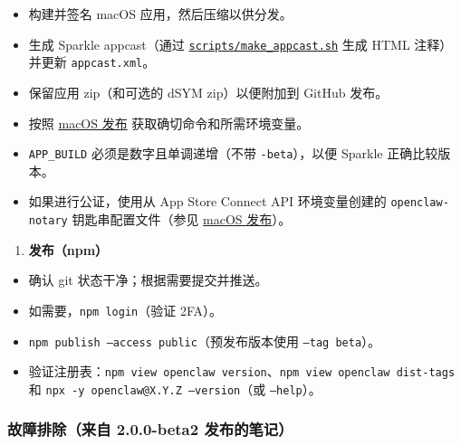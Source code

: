 \begin{itemize}
  \item [ ] 构建并签名 macOS 应用，然后压缩以供分发。
  \item [ ] 生成 Sparkle appcast（通过 \href{https://github.com/openclaw/openclaw/blob/main/scripts/make\_appcast.sh}{\texttt{scripts/make\_appcast.sh}} 生成 HTML 注释）并更新 \texttt{appcast.xml}。
  \item [ ] 保留应用 zip（和可选的 dSYM zip）以便附加到 GitHub 发布。
  \item [ ] 按照 \href{/platforms/mac/release}{macOS 发布} 获取确切命令和所需环境变量。
  \item \texttt{APP\_BUILD} 必须是数字且单调递增（不带 \texttt{-beta}），以便 Sparkle 正确比较版本。
  \item 如果进行公证，使用从 App Store Connect API 环境变量创建的 \texttt{openclaw-notary} 钥匙串配置文件（参见 \href{/platforms/mac/release}{macOS 发布}）。
\end{itemize}


\begin{enumerate}
  \item \textbf{发布（npm）}
\end{enumerate}


\begin{itemize}
  \item [ ] 确认 git 状态干净；根据需要提交并推送。
  \item [ ] 如需要，\texttt{npm login}（验证 2FA）。
  \item [ ] \texttt{npm publish --access public}（预发布版本使用 \texttt{--tag beta}）。
  \item [ ] 验证注册表：\texttt{npm view openclaw version}、\texttt{npm view openclaw dist-tags} 和 \texttt{npx -y openclaw@X.Y.Z --version}（或 \texttt{--help}）。
\end{itemize}


\subsubsection{故障排除（来自 2.0.0-beta2 发布的笔记）}


